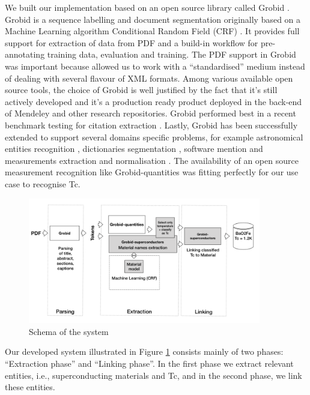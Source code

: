 \documentclass{article}[a4]
\begin{document}
We built our implementation based on an open source library called Grobid \cite{GROBID}. Grobid is a sequence labelling and document segmentation originally based on a Machine Learning algorithm Conditional Random Field (CRF) \cite{lafferty2001conditional}. It provides full support for extraction of data from PDF and a build-in workflow for pre-annotating training data, evaluation and training. 
The PDF support in Grobid was important because allowed us to work with a “standardised” medium instead of dealing with several flavour of XML formats. Among various available open source tools, the choice of Grobid is well justified by the fact that it's still actively developed and it's a production ready product deployed in the back-end of Mendeley \cite{mendeley-extraction} and other research repositories. Grobid performed best in a recent benchmark testing for citation extraction \cite{DBLP:journals/corr/abs-1802-01168}. Lastly, Grobid has been successfully extended to support several domains specific problems, for example astronomical entities recognition \cite{grobid-astro}, dictionaries segmentation \cite{khemakhem2017automatic}, software mention \cite{software-mentions} and measurements extraction and normalisation \cite{grobid-quantities}. The availability of an open source measurement recognition like Grobid-quantities was fitting perfectly for our use case to recognise Tc. 

\begin{figure}[]
    \centering
    \includegraphics[width=4in]{schema}
    \caption[Schema of the system] {Schema of the system}
    \label{fig:system-schema}
\end{figure}

Our developed system illustrated in Figure \ref{fig:system-schema} consists mainly of two phases: “Extraction phase” and “Linking phase”. In the first phase we extract relevant entities, i.e., superconducting materials and Tc, and in the second phase, we link these entities.
\end{document}
